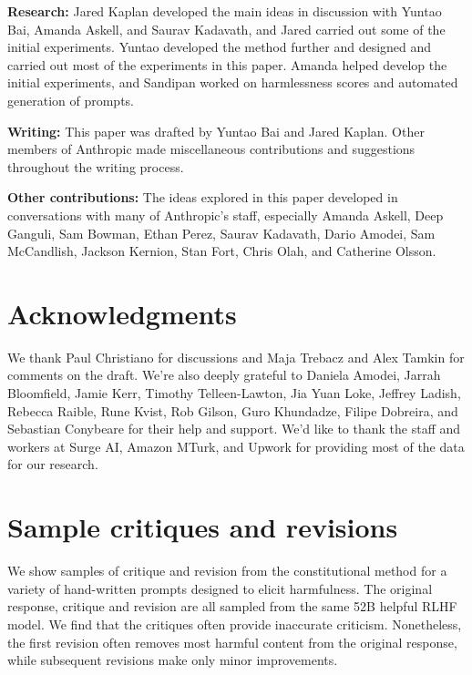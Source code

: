 \documentclass[english]{article}
\renewcommand\>{\rangle}
\begin{document}
{\bf Research:} Jared Kaplan  developed the main ideas in discussion with Yuntao Bai, Amanda Askell, and Saurav Kadavath, and Jared carried out some of the initial experiments. Yuntao  developed the method further and designed and carried out most of the experiments in this paper. Amanda  helped develop the initial experiments, and Sandipan  worked on harmlessness scores and automated generation of prompts.

{\bf Writing:} This paper was drafted by Yuntao Bai and Jared Kaplan. Other members of Anthropic made miscellaneous contributions and suggestions throughout the writing process.

{\bf Other contributions:} The ideas explored in this paper developed in conversations with many of Anthropic's staff, especially Amanda Askell, Deep Ganguli, Sam Bowman, Ethan Perez, Saurav Kadavath, Dario Amodei, Sam McCandlish, Jackson Kernion, Stan Fort, Chris Olah, and Catherine Olsson.



\section*{Acknowledgments}

We thank Paul Christiano for discussions and Maja Trebacz and Alex Tamkin  for comments on the draft. We're also deeply grateful to Daniela Amodei, Jarrah Bloomfield, Jamie Kerr, Timothy Telleen-Lawton, Jia Yuan Loke, Jeffrey Ladish, Rebecca Raible, Rune Kvist, Rob Gilson, Guro Khundadze, Filipe Dobreira, and Sebastian Conybeare for their help and support. We'd like to thank the staff and workers at Surge AI, Amazon MTurk, and Upwork for providing most of the data for our research.





\appendix




\section{Sample critiques and revisions}
\label{app:SamplesCAI}

We show samples of critique and revision from the constitutional method for a variety of hand-written prompts designed to elicit harmfulness. The original response, critique and revision are all sampled from the same 52B helpful RLHF model. We find that the critiques often provide inaccurate criticism. Nonetheless, the first revision often removes most harmful content from the original response, while subsequent revisions make only minor improvements.
\end{document}
